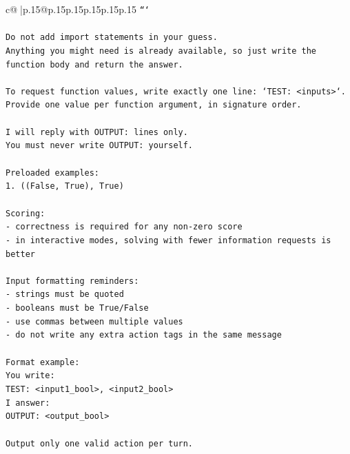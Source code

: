 \documentclass{article}
\begin{document}
{\begin{supertabular}{c@{$\;$}|p{.15\linewidth}@{}p{.15\linewidth}p{.15\linewidth}p{.15\linewidth}p{.15\linewidth}p{.15\linewidth}}
{{{\texttt{```} \\
\\ 
\texttt{Do not add import statements in your guess.} \\
\texttt{Anything you might need is already available, so just write the function body and return the answer.} \\
\\ 
\texttt{To request function values, write exactly one line: `TEST: <inputs>`.} \\
\texttt{Provide one value per function argument, in signature order.} \\
\\ 
\texttt{I will reply with OUTPUT: lines only.} \\
\texttt{You must never write OUTPUT: yourself.} \\
\\ 
\texttt{Preloaded examples:} \\
\texttt{1. ((False, True), True)} \\
\\ 
\texttt{Scoring:} \\
\texttt{{-} correctness is required for any non{-}zero score} \\
\texttt{{-} in interactive modes, solving with fewer information requests is better} \\
\\ 
\texttt{Input formatting reminders:} \\
\texttt{{-} strings must be quoted} \\
\texttt{{-} booleans must be True/False} \\
\texttt{{-} use commas between multiple values} \\
\texttt{{-} do not write any extra action tags in the same message} \\
\\ 
\texttt{Format example:} \\
\texttt{You write:} \\
\texttt{TEST: <input1\_bool>, <input2\_bool>} \\
\texttt{I answer:} \\
\texttt{OUTPUT: <output\_bool>} \\
\\ 
\texttt{Output only one valid action per turn.} \\
            }
        }
    }
     \\ \\


\end{supertabular}}
\end{document}
